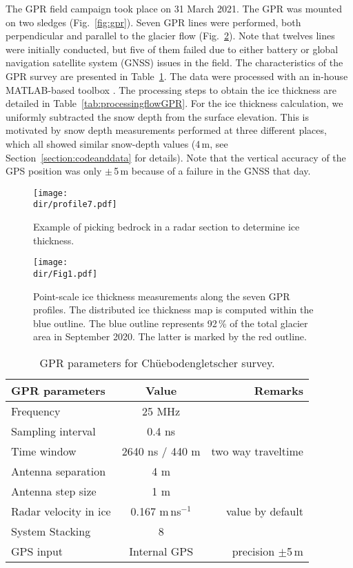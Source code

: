 The GPR field campaign took place on 31 March 2021. The GPR was mounted on two sledges (Fig.~\ref{fig:gpr}). Seven GPR lines were performed, both perpendicular and parallel to the glacier flow (Fig.~\ref{fig:fig1}). Note that twelves lines were initially conducted, but five of them failed due to either battery or global navigation satellite system (GNSS) issues in the field. The characteristics of the GPR survey are presented in Table~\ref{tab_gpr}. The data were processed with an in-house MATLAB-based toolbox \citep[e.g.][]{Langhammer&al2019}. The processing steps to obtain the ice thickness are detailed in Table~\ref{tab:processingflowGPR}. For the ice thickness calculation, we uniformly subtracted the snow depth from the surface elevation. This is motivated by snow depth measurements performed at three different places, which all showed similar snow-depth values (4\,m, see Section~\ref{section:codeanddata} for details). Note that the vertical accuracy of the GPS position was only $\pm$\,5\,m because of a failure in the GNSS that day. 

\begin{figure}[h!]
\centering
\texttt{[image: \\dir/profile7.pdf]}
\caption{Example of picking bedrock in a radar section to determine ice thickness.}
\label{fig:prof7}
\end{figure}

\begin{figure}[h!]
\centering
\texttt{[image: \\dir/Fig1.pdf]}
\caption{Point-scale ice thickness measurements along the seven GPR profiles. The distributed ice thickness map is computed within the blue outline. The blue outline represents 92\,\% of the total glacier area in September 2020. The latter is marked by the red outline.}
\label{fig:fig1}
\end{figure}

\begin{table}[h!]
    \centering
    \begin{tabular}{l c r}
         \hline
\textbf{GPR parameters}  & \textbf{Value} & \textbf{Remarks} \\
\hline
Frequency & 25 MHz  \\
Sampling interval & 0.4 ns \\
Time window & 2640 ns / 440 m & two way traveltime\\
Antenna separation & 4 m \\
Antenna step size & 1 m \\
Radar velocity in ice & 0.167 m\,ns$^{-1}$ & value by default \\
System Stacking & 8 & \\
GPS input & Internal GPS & precision $\pm$5\,m\\
\hline
    \end{tabular}
    \caption{GPR parameters for Chüebodengletscher survey.}
    \label{tab_gpr}
\end{table}


